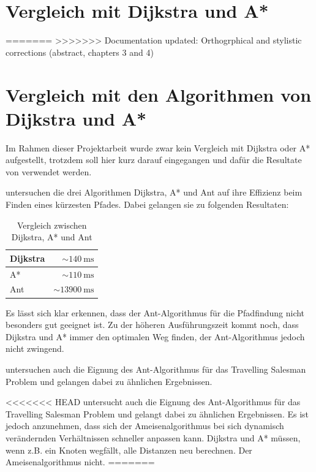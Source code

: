 \section{Vergleich mit Dijkstra und A*}
=======
>>>>>>> Documentation updated: Orthogrphical and stylistic corrections (abstract, chapters 3 and 4)



\section{Vergleich mit den Algorithmen von Dijkstra und A*}

Im Rahmen dieser Projektarbeit wurde zwar kein Vergleich mit Dijkstra oder A* aufgestellt, trotzdem soll hier kurz darauf eingegangen und dafür die Resultate von \citet*{leo-perf} verwendet werden.

\citeauthor*{leo-perf} untersuchen die drei Algorithmen Dijkstra, A* und Ant auf ihre Effizienz beim Finden eines kürzesten Pfades. Dabei gelangen sie zu folgenden Resultaten:

\begin{table}[h]
\small\sffamily\renewcommand{\arraystretch}{1.5}
\begin{tabular}{ | l | r | }
\hline
Dijkstra & $\sim\SI{140}{\milli\s}$ \\
\hline
A* & $\sim\SI{110}{\milli\s}$ \\
\hline
Ant & $\sim\SI{13900}{\milli\s}$  \\
\hline
\end{tabular}
\caption{Vergleich zwischen Dijkstra, A* und Ant}
\end{table}

\noindent
Es lässt sich klar erkennen, dass der Ant-Algorithmus für die Pfadfindung nicht besonders gut geeignet ist. Zu der höheren Ausführungszeit kommt noch, dass Dijkstra und A* immer den optimalen Weg finden, der Ant-Algorithmus jedoch nicht zwingend.

\citeauthor*{leo-perf} untersuchen auch die Eignung des Ant-Algorithmus für das Travelling Salesman Problem und gelangen dabei zu ähnlichen Ergebnissen.



<<<<<<< HEAD
\citeauthor*{leo-perf} untersucht auch die Eignung des Ant-Algorithmus für das Travelling Salesman Problem und gelangt dabei zu ähnlichen Ergebnissen. Es ist jedoch anzunehmen, dass sich der Ameisenalgorithmus bei sich dynamisch verändernden Verhältnissen schneller anpassen kann. Dijkstra und A* müssen, wenn z.B. ein Knoten wegfällt, alle Distanzen neu berechnen. Der Ameisenalgorithmus nicht.
=======

